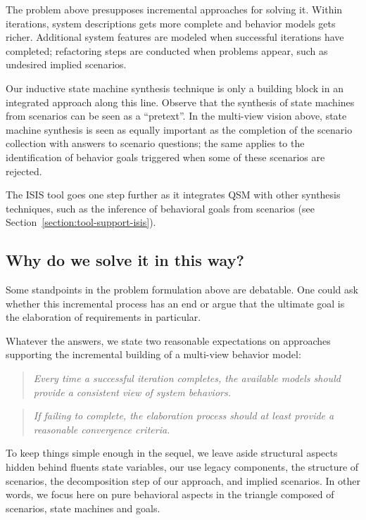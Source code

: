 The problem above presupposes incremental approaches for solving it. Within iterations, system descriptions gets more complete and behavior models gets richer. Additional system features are modeled when successful iterations have completed; refactoring steps are conducted when problems appear, such as undesired implied scenarios.

Our inductive state machine synthesis technique is only a building block in an integrated approach along this line. Observe that the synthesis of state machines from scenarios can be seen as a ``pretext''. In the multi-view vision above, state machine synthesis is seen as equally important as the completion of the scenario collection with answers to scenario questions; the same applies to the identification of behavior goals triggered when some of these scenarios are rejected. 

The ISIS tool goes one step further as it integrates QSM with other synthesis techniques, such as the inference of behavioral goals from scenarios (see Section~\ref{section:tool-support-isis}).

\subsection{Why do we solve it in this way?}

Some standpoints in the problem formulation above are debatable. One could ask whether this incremental process has an end or argue that the ultimate goal is the elaboration of requirements in particular. 

Whatever the answers, we state two reasonable expectations on approaches supporting the incremental building of a multi-view behavior model:
\begin{quotation}
\emph{Every time a successful iteration completes, the available models should provide a consistent view of system behaviors.}
\end{quotation}
\begin{quotation}
\emph{If failing to complete, the elaboration process should at least provide a reasonable convergence criteria.}
\end{quotation}

To keep things simple enough in the sequel, we leave aside structural aspects hidden behind fluents state variables, our use legacy components, the structure of scenarios, the decomposition step of our approach, and implied scenarios. In other words, we focus here on pure behavioral aspects in the triangle composed of scenarios, state machines and goals.

